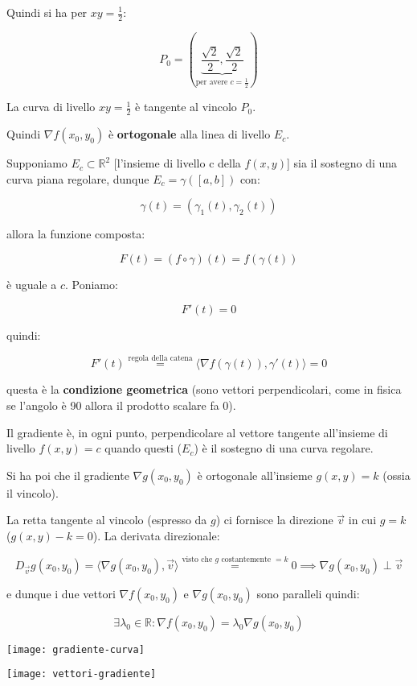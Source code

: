 \documentclass[../appunti-analisi.tex]{subfiles}
\begin{document}
Quindi si ha per $xy = \frac{1}{2}$:

\[
P_0 = ( \underbrace{\frac{\sqrt{2}}{2}, \frac{\sqrt{2}}{2}}_\text{per avere $c= \frac{1}{2}$})
\]

La curva di livello $xy=\frac{1}{2}$ è tangente al vincolo $P_0$.

Quindi $\nabla f(x_0,y_0)$ è \textbf{ortogonale} alla linea di livello $E_c$.

Supponiamo $E_c \subset \mathbb{R}^{2}$ [l'insieme di livello c della $f(x,y)$] sia il sostegno di una curva piana regolare, dunque $E_c = \gamma([a,b])$ con:

\[
    \gamma(t) = (\gamma_1(t), \gamma_2(t))
\]

allora la funzione composta:

\[
    F(t) = (f \circ \gamma) (t) = f(\gamma(t))
\]

è uguale a $c$. Poniamo:

\[
    F'(t)=0
\]

quindi:

\[
    F'(t) \overset{\text{regola della catena}}{=} \langle \nabla f(\gamma(t)), \gamma'(t) \rangle = 0
\]

questa è la \textbf{condizione geometrica} (sono vettori perpendicolari, come in fisica se l'angolo è 90 allora il prodotto scalare fa 0).

Il gradiente è, in ogni punto, perpendicolare al vettore tangente all'insieme di livello $f(x,y) = c$ quando questi ($E_c$) è il sostegno di una curva regolare.

Si ha poi che il gradiente $\nabla g(x_0,y_0)$ è ortogonale all'insieme $g(x,y) = k$ (ossia il vincolo).


La retta tangente al vincolo (espresso da $g$) ci fornisce la direzione $\vec{v}$ in cui $g=k$ ($g(x,y) -k=0$). La derivata direzionale:

\[
    D_{\vec{v}} g(x_0,y_0) = \langle \nabla g(x_0,y_0), \vec{v} \rangle \overset{\text{visto che $g$ costantemente $=k$}}{=} 0 \implies \nabla g(x_0,y_0) \perp \vec{v}
\]

e dunque i due vettori $\nabla f(x_0,y_0)$ e $\nabla g(x_0,y_0)$ sono paralleli quindi:

\[
\exists \lambda_0 \in \mathbb{R}: \nabla f(x_0,y_0) = \lambda_0 \nabla g(x_0,y_0)
\]

\texttt{[image: gradiente-curva]}

\begin{center}
\texttt{[image: vettori-gradiente]}
\end{center}
\end{document}
